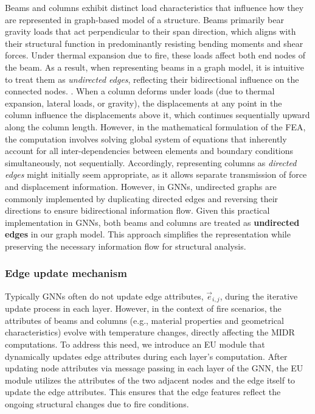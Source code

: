 Beams and columns exhibit distinct load characteristics that influence how they are represented in graph-based model of a structure. Beams primarily bear gravity loads that act perpendicular to their span direction, which aligns with their structural function in predominantly resisting bending moments and shear forces. Under thermal expansion due to fire, these loads affect both end nodes of the beam. As a result, when representing beams in a graph model, it is intuitive to treat them as {\em{undirected edges}}, reflecting their bidirectional influence on the connected nodes. {}. When a column deforms under loads (due to thermal expansion, lateral loads, or gravity), the displacements at any point in the column influence the displacements above it, which continues sequentially upward along the column length. However, in the mathematical formulation of the FEA, the computation involves solving global system of equations that inherently account for all inter-dependencies between elements and boundary conditions simultaneously, not sequentially. Accordingly, representing columns as {\em{directed edges}} might initially seem appropriate, as it allows separate transmission of force and displacement information. However, in GNNs, undirected graphs are commonly implemented by duplicating directed edges and reversing their directions to ensure bidirectional information flow. Given this practical implementation in GNNs, both beams and columns are treated as {\bf{undirected edges}} in our graph model. This approach simplifies the representation while preserving the necessary information flow for structural analysis.

\subsubsection{Edge update mechanism}
\label{subsubsec:edge_update}
Typically GNNs often do not update edge attributes, $\vec{e}_{i,j}$, during the iterative update process in each layer. However, in the context of fire scenarios, the attributes of beams and columns (e.g., material properties and geometrical characteristics) evolve with temperature changes, directly affecting the MIDR computations. To address this need, we introduce an EU module that dynamically updates edge attributes during each layer's computation. After updating node attributes via message passing in each layer of the GNN, the EU module utilizes the attributes of the two adjacent nodes and the edge itself to update the edge attributes. This ensures that the edge features reflect the ongoing structural changes due to fire conditions. 

